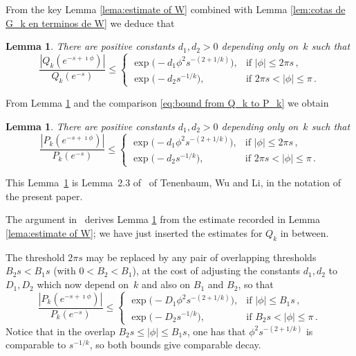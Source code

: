 \documentclass[12pt]{amsart}
\newtheorem{lemma}{Lemma}[section]
\newtheorem{lemmaL}{Lemma}
\theoremstyle{definition}
\begin{document}
From the key Lemma \ref{lema:estimate of W} combined with Lemma \ref{lem:cotas de G_k en terminos de W} we deduce that

\begin{lemma}\label{lem:bounds of char de Q}
There are positive constants $d_1, d_2>0$ depending only on~$k$ such that
\[
\frac{|Q_k(e^{-s+\imath\phi})|}{Q_k(e^{-s})} \le
\begin{cases}
\exp\!\big(-d_1 \phi^2 s^{-(2+1/k)}\big), & \text{if } |\phi|\le 2\pi s\,,\\[4pt]
\exp\!\big(-d_2 s^{-1/k}\big), & \text{if } 2\pi s < |\phi| \le \pi\,.
\end{cases}
\]
\end{lemma}

From Lemma \ref{lem:bounds of char de Q} and the comparison \eqref{eq:bound from Q_k to P_k} we obtain

\begin{lemmaL}\label{lem:bounds of char de P}
There are positive constants $d_1, d_2>0$ depending only on~$k$ such that
\[
\frac{|P_k(e^{-s+\imath\phi})|}{P_k(e^{-s})} \le
\begin{cases}
\exp\!\big(-d_1 \phi^2 s^{-(2+1/k)}\big), & \text{if } |\phi|\le 2\pi s\,,\\[4pt]
\exp\!\big(-d_2 s^{-1/k}\big), & \text{if } 2\pi s < |\phi| \le \pi\,.
\end{cases}
\]
\end{lemmaL}

This Lemma~\ref{lem:bounds of char de P} is Lemma~2.3 of~\cite{TWLarxiv} of Tenenbaum, Wu and Li,  in the notation of the present  paper.
\smallskip

The argument in~\cite{TWLarxiv} derives Lemma \ref{lem:bounds of char de P}  from the estimate recorded in Lemma \ref{lema:estimate of W}; we have just inserted the estimates for $Q_k$ in between.
\smallskip

The threshold $2\pi s$ may be replaced by any pair of overlapping thresholds $B_2 s < B_1 s$
(with $0<B_2<B_1$), at the cost of adjusting the constants $d_1, d_2$ to $D_1, D_2$ which now
depend on~$k$ and also on $B_1$ and $B_2$, so that
\begin{equation}\label{eq:TWLgeneral}
\frac{|P_k(e^{-s+\imath\phi})|}{P_k(e^{-s})} \le
\begin{cases}
\exp\!\big(-D_1 \phi^2 s^{-(2+1/k)}\big), & \text{if } |\phi|\le B_1 s\,,\\[4pt]
\exp\!\big(-D_2 s^{-1/k}\big), & \text{if } B_2 s < |\phi| \le \pi\,.
\end{cases}
\end{equation}
Notice that in the overlap $B_2 s \le |\phi| \le B_1 s$, one has that $\phi^2 s^{-(2+1/k)}$ is comparable to
$s^{-1/k}$, so both bounds give comparable decay.
\end{document}
